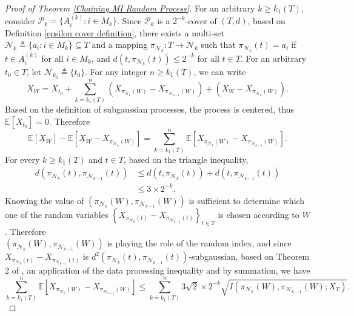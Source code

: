 \documentclass{article}
\newcommand{\E}{\mathbb{E}}
\newcommand{\pa}{\mathcal{P}}
\begin{document}
\begin{proof}[Proof of Theorem \ref{Chaining MI Random Process}]
		
For an arbitrary $k\geq k_1(T)$, consider $\pa_k=\{A^{(k)}_i: i\in M_k\}$. Since $\pa_k$ is a $2^{-k}$-cover of $(T,d)$, based on Definition \ref{epsilon cover definition}, there exists a multi-set $\mathcal{N}_k\triangleq\{a_i:i\in M_k\}\subseteq T$ and a mapping $\pi_{\mathcal{N}_k}:T\to \mathcal{N}_k$ such that $\pi_{\mathcal{N}_k}(t)=a_i$ if $t\in A_i^{(k)}$ for all $i\in M_k$, and $d\left(t,\pi_{\mathcal{N}_k}(t)\right)\leq 2^{-k}$ for all $t\in T$. For an arbitrary $t_0\in T$, let $\mathcal{N}_{k_0}\triangleq \{t_0\}$. 
For any integer $n\geq k_1(T)$, we can write
\begin{equation}\nonumber
X_W=X_{t_0}+\sum_{k=k_1(T)}^n \left(X_{\pi_{\mathcal{N}_k}(W)}-X_{\pi_{\mathcal{N}_{k-1}}(W)}\right)+\left(X_W-X_{\pi_{\mathcal{N}_n}(W)}\right).
\end{equation}
Based on the definition of subgaussian processes, the process is centered, thus $\E [X_{t_0}]=0$. Therefore 
\begin{equation}\nonumber
\E [X_W]-\E \left[X_W-X_{\pi_{\mathcal{N}_n}(W)}\right]=\sum_{k=k_1(T)}^n \E \left[X_{\pi_{\mathcal{N}_k}(W)}-X_{\pi_{\mathcal{N}_{k-1}}(W)}\right].
\end{equation}
For every $k\geq k_1(T)$ and $t\in T$, based on the triangle inequality,
\begin{align}
d\left(\pi_{\mathcal{N}_k}(t),\pi_{\mathcal{N}_{k-1}}(t)\right)&\leq d\left(t,\pi_{\mathcal{N}_k}(t)\right)+d\left(t,\pi_{\mathcal{N}_{k-1}}(t)\right)\nonumber\\
&\leq 3\times 2^{-k}.\nonumber
\end{align} 
Knowing the value of $\left(\pi_{\mathcal{N}_k}(W),\pi_{\mathcal{N}_{k-1}}(W)\right)$ is sufficient to determine which one of the random variables $\left\{X_{\pi_{\mathcal{N}_k}(t)}-X_{\pi_{\mathcal{N}_{k-1}}(t)}\right\}_{t\in T}$ is chosen according to $W$. Therefore \\$\left(\pi_{\mathcal{N}_k}(W),\pi_{\mathcal{N}_{k-1}}(W)\right)$ is playing the role of the random index, and since $X_{\pi_{\mathcal{N}_k}(t)}-X_{\pi_{\mathcal{N}_{k-1}}(t)}$ is $d^2\left(\pi_{\mathcal{N}_k}(t),\pi_{\mathcal{N}_{k-1}}(t)\right)$-subgaussian, based on Theorem 2 of \cite{xu2017information}, an application of the data processing inequality and by summation, we have
\begin{equation}
\sum_{k=k_1(T)}^n\E \left[X_{\pi_{\mathcal{N}_k}(W)}-X_{\pi_{\mathcal{N}_{k-1}}(W)}\right]\leq \sum_{k=k_1(T)}^n 3\sqrt{2}\times 2^{-k}\sqrt{I(\pi_{\mathcal{N}_k}(W),\pi_{\mathcal{N}_{k-1}}(W);X_T)}.\nonumber

\end{equation}
\end{proof}
\end{document}
